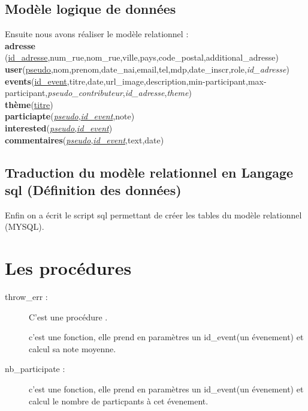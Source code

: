 \documentclass[oneside,11pt,a4paper]{article}
\begin{document}
\subsection{Modèle logique de données}
Ensuite nous avons réaliser le modèle relationnel : 
\\	
\textbf{adresse} (\underline{id\_adresse},num\_rue,nom\_rue,ville,pays,code\_postal,additional\_adresse)\\
\textbf{user}(\underline{pseudo},nom,prenom,date\_nai,email,tel,mdp,date\_inscr,role,\textit{id\_adresse})\\
\textbf{events}(\underline{id\_event},titre,date,url\_image,description,min-participant,max-participant,\textit{pseudo\_contributeur},\textit{id\_adresse},\textit{theme})\\
\textbf{thème}(\underline{titre})\\
\textbf{particiapte}(\underline{\textit{pseudo},\textit{id\_event}},note)\\
\textbf{interested}(\underline{\textit{pseudo},\textit{id\_event}})\\
\textbf{commentaires}(\underline{\textit{pseudo},\textit{id\_event}},text,date)\\

\subsection{Traduction du modèle relationnel en Langage sql (Définition des données)}
Enfin on a écrit le script sql permettant de créer les tables du modèle relationnel (MYSQL).
\section{Les procédures}
\begin{description}
	\item[ throw\_err : ] C'est une procédure .
	 
	\item[ ] c'est une fonction, elle prend en paramètres un id\_event(un évenement) et calcul sa note moyenne.
	\item[] 
	\item[nb\_participate : ] c'est une fonction, elle prend en paramètres un id\_event(un évenement) et calcul le nombre de particpants à cet évenement.
\end{description}
\end{document}
